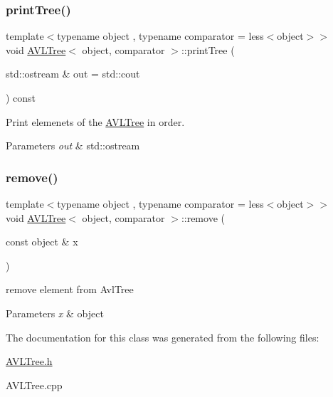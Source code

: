 \subsubsection{\texorpdfstring{print\+Tree()}{printTree()}}
{\footnotesize\ttfamily template$<$typename object , typename comparator  = less$<$object$>$$>$ \\
void \hyperlink{class_a_v_l_tree}{A\+V\+L\+Tree}$<$ object, comparator $>$\+::print\+Tree (\begin{DoxyParamCaption}\item[{std\+::ostream \&}]{out = {\ttfamily std\+:\+:cout} }\end{DoxyParamCaption}) const\hspace{0.3cm}{\ttfamily [inline]}}



Print elemenets of the \hyperlink{class_a_v_l_tree}{A\+V\+L\+Tree} in order. 


\begin{DoxyParams}{Parameters}
{\em out} & std\+::ostream \\
\hline
\end{DoxyParams}
\hypertarget{class_a_v_l_tree_addcc3b4db7631a7c21ca43a9ac3b1a84}{}\label{class_a_v_l_tree_addcc3b4db7631a7c21ca43a9ac3b1a84} 
\subsubsection{\texorpdfstring{remove()}{remove()}}
{\footnotesize\ttfamily template$<$typename object , typename comparator  = less$<$object$>$$>$ \\
void \hyperlink{class_a_v_l_tree}{A\+V\+L\+Tree}$<$ object, comparator $>$\+::remove (\begin{DoxyParamCaption}\item[{const object \&}]{x }\end{DoxyParamCaption})\hspace{0.3cm}{\ttfamily [inline]}}



remove element from Avl\+Tree 


\begin{DoxyParams}{Parameters}
{\em x} & object \\
\hline
\end{DoxyParams}


The documentation for this class was generated from the following files\+:\begin{DoxyCompactItemize}
\item 
\hyperlink{_a_v_l_tree_8h}{A\+V\+L\+Tree.\+h}\item 
A\+V\+L\+Tree.\+cpp\end{DoxyCompactItemize}
